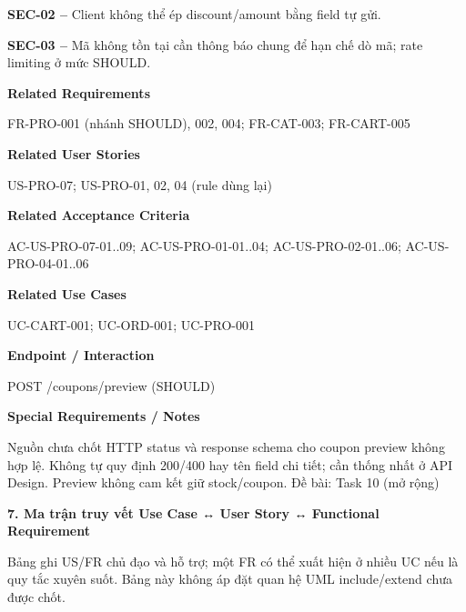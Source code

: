 \documentclass[11pt,a4paper,oneside]{report}
\begin{document}
\textbf{SEC-02 --} Client không thể ép discount/amount bằng field tự gửi.

\textbf{SEC-03 --} Mã không tồn tại cần thông báo chung để hạn chế dò mã; rate limiting ở mức SHOULD.
\par

\par\smallskip\noindent\textcolor{sgublue}{\textbf{Related Requirements}}\par\nobreak
FR-PRO-001 (nhánh SHOULD), 002, 004; FR-CAT-003; FR-CART-005
\par

\par\smallskip\noindent\textcolor{sgublue}{\textbf{Related User Stories}}\par\nobreak
US-PRO-07; US-PRO-01, 02, 04 (rule dùng lại)
\par

\par\smallskip\noindent\textcolor{sgublue}{\textbf{Related Acceptance Criteria}}\par\nobreak
AC-US-PRO-07-01..09; AC-US-PRO-01-01..04; AC-US-PRO-02-01..06; AC-US-PRO-04-01..06
\par

\par\smallskip\noindent\textcolor{sgublue}{\textbf{Related Use Cases}}\par\nobreak
UC-CART-001; UC-ORD-001; UC-PRO-001
\par

\par\smallskip\noindent\textcolor{sgublue}{\textbf{Endpoint / Interaction}}\par\nobreak
POST /coupons/preview (SHOULD)
\par

\par\smallskip\noindent\textcolor{sgublue}{\textbf{Special Requirements / Notes}}\par\nobreak
Nguồn chưa chốt HTTP status và response schema cho coupon preview không hợp lệ. Không tự quy định 200/400 hay tên field chi tiết; cần thống nhất ở API Design. Preview không cam kết giữ stock/coupon. \textbar{} Đề bài: Task 10 (mở rộng)
\par



\textbf{7. Ma trận truy vết Use Case ↔ User Story ↔ Functional Requirement}

Bảng ghi US/FR chủ đạo và hỗ trợ; một FR có thể xuất hiện ở nhiều UC nếu là quy tắc xuyên suốt. Bảng này không áp đặt quan hệ UML include/extend chưa được chốt.
\end{document}
